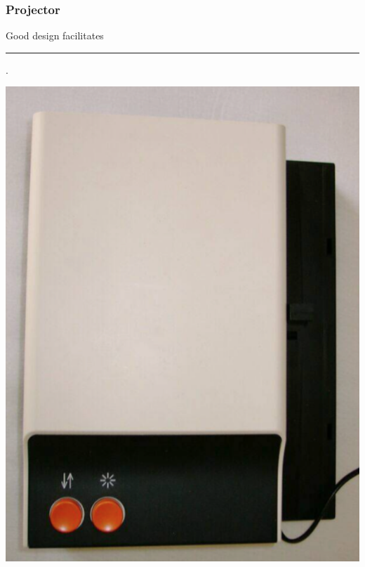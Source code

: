 \documentclass{beamer}
\begin{document}
\begin{frame}
\frametitle{Projector}
\begin{center}
Good design facilitates  \rule{2cm}{0.15mm}.
\end{center}
	
\centering
\includegraphics[width=0.4\linewidth]{zeiss}
	
\end{frame}
\end{document}
